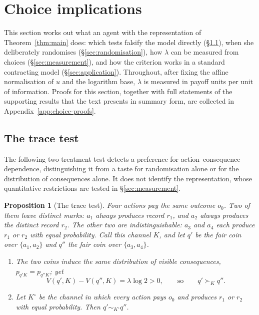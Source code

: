 \documentclass[11pt,a4paper]{article}
\newtheorem{proposition}[theorem]{Proposition}
\theoremstyle{definition}
\newcommand{\1}{\mathbf 1}
\begin{document}
\section{Choice implications}\label{sec:implications}

This section works out what an agent with the representation of Theorem~\ref{thm:main} does: which tests
falsify the model directly (\S\ref{sec:tracetest}), when she deliberately randomises (\S\ref{sec:randomisation}),
how $\lambda$ can be measured from choices (\S\ref{sec:measurement}), and how the criterion works in a
standard contracting model (\S\ref{sec:application}).
Throughout, after fixing the affine normalisation of $u$ and the logarithm base, $\lambda$ is measured in payoff units per unit of information.  Proofs for this
section, together with full statements of the supporting results that the text presents in summary form, are
collected in Appendix~\ref{app:choice-proofs}.

\subsection{The trace test}\label{sec:tracetest}

The following two-treatment test detects a preference for action--consequence dependence, distinguishing
it from a taste for randomisation alone or for the distribution of consequences alone.  It does not identify
the representation, whose quantitative restrictions are tested in \S\ref{sec:measurement}.

\begin{proposition}[The trace test]\label{prop:signature}
Four actions pay the same outcome $o_0$.  Two of them leave distinct marks: $a_1$ always produces record $r_1$,
and $a_2$ always produces the distinct record $r_2$.  The other two are indistinguishable: $a_3$ and $a_4$ each
produce $r_1$ or $r_2$ with equal probability.  Call this channel $K$, and let $q'$ be the fair coin over
$\{a_1,a_2\}$ and $q''$ the fair coin over $\{a_3,a_4\}$.
\begin{enumerate}[label=\textup{(\roman*)},leftmargin=*]
\item The two coins induce the same distribution of visible consequences, $p_{q'K}=p_{q''K}$; yet
\[
 V(q',K)-V(q'',K)=\lambda\log2>0,
 \qquad\text{so}\qquad
 q'\succ_Kq''.
\]
\item Let $K^\circ$ be the channel in which every action pays $o_0$ and produces $r_1$ or $r_2$ with equal
probability.  Then $q'\sim_{K^\circ}q''$.
\end{enumerate}
\end{proposition}
\end{document}
